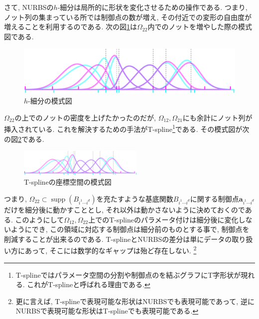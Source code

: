 \documentclass{jsarticle}
\DeclareMathOperator{\supp}{supp}
\theoremstyle{definition}%
\begin{document}
さて, NURBSの$h$-細分は局所的に形状を変化させるための操作である.
つまり, ノット列の集まっている所では制御点の数が増え, その付近での変形の自由度が増えることを利用するのである.
次の図\ref{Fig603}は$\Omega_{22}$内でのノットを増やした際の模式図である.
\begin{figure}[H]
	\centering
    \includegraphics[page=6,clip,width=120mm]{figA.pdf}
    \caption{$h$-細分の模式図}
	\label{Fig603}
\end{figure}
$\Omega_{22}$の上でのノットの密度を上げたかったのだが, $\Omega_{12}, \Omega_{21}$にも余計にノット列が挿入されている.
これを解決するための手法がT-spline\footnote{T-splineではパラメータ空間の分割や制御点のを結ぶグラフにT字形状が現れる. これがT-splineと呼ばれる理由である.}である.
その模式図が次の図\ref{Fig604}である.
\begin{figure}[H]
	\centering
    \includegraphics[page=7,clip,width=60mm]{figA.pdf}
    \caption{T-splineの座標空間の模式図}
	\label{Fig604}
\end{figure}
つまり, $\Omega_{22}\subset\supp(B_{i^1\cdots i^d})$を充たすような基底関数$B_{i^1\cdots i^d}$に関する制御点$\bm{a}_{i^1\cdots i^d}$だけを細分後に動かすこととし, それ以外は動かさないように決めておくのである.
このようにして$\Omega_{12},\Omega_{22}$上でのT-splineのパラメータ付けは細分後に変化しないようにでき, この領域に対応する制御点は細分前のものとする事で, 制御点を削減することが出来るのである.
T-splineとNURBSの差分は単にデータの取り扱い方にあって, そこには数学的なギャップは殆ど存在しない.%
\footnote{更に言えば, T-splineで表現可能な形状はNURBSでも表現可能であって, 逆にNURBSで表現可能な形状はT-splineでも表現可能である.}
\end{document}

